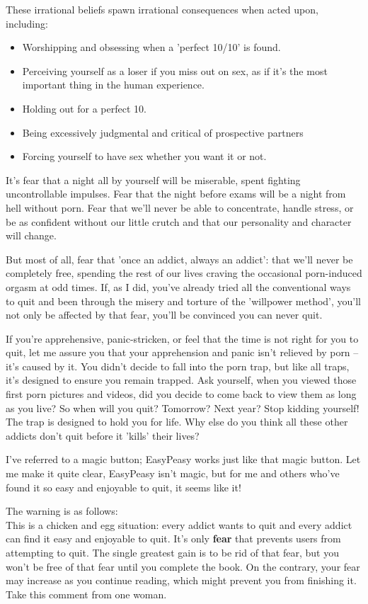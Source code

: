 \documentclass[
]{book}
\begin{document}
These irrational beliefs spawn irrational consequences when acted upon, including:

\begin{itemize}
\item
  Worshipping and obsessing when a 'perfect 10/10' is found.
\item
  Perceiving yourself as a loser if you miss out on sex, as if it's the most important thing in the human experience.
\item
  Holding out for a perfect 10.
\item
  Being excessively judgmental and critical of prospective partners
\item
  Forcing yourself to have sex whether you want it or not.
\end{itemize}

It's fear that a night all by yourself will be miserable, spent fighting uncontrollable impulses. Fear that the night before exams will be a night from hell without porn. Fear that we'll never be able to concentrate, handle stress, or be as confident without our little crutch and that our personality and character will change.

But most of all, fear that 'once an addict, always an addict': that we'll never be completely free, spending the rest of our lives craving the occasional porn-induced orgasm at odd times. If, as I did, you've already tried all the conventional ways to quit and been through the misery and torture of the 'willpower method', you'll not only be affected by that fear, you'll be convinced you can never quit.

If you're apprehensive, panic-stricken, or feel that the time is not right for you to quit, let me assure you that your apprehension and panic isn't relieved by porn -- it's caused by it. You didn't decide to fall into the porn trap, but like all traps, it's designed to ensure you remain trapped. Ask yourself, when you viewed those first porn pictures and videos, did you decide to come back to view them as long as you live? So when will you quit? Tomorrow? Next year? Stop kidding yourself! The trap is designed to hold you for life. Why else do you think all these other addicts don't quit before it 'kills' their lives?

I've referred to a magic button; EasyPeasy works just like that magic button. Let me make it quite clear, EasyPeasy isn't magic, but for me and others who've found it so easy and enjoyable to quit, it seems like it!

The warning is as follows:\\
This is a chicken and egg situation: every addict wants to quit and every addict can find it easy and enjoyable to quit. It's only \textbf{fear} that prevents users from attempting to quit. The single greatest gain is to be rid of that fear, but you won't be free of that fear until you complete the book. On the contrary, your fear may increase as you continue reading, which might prevent you from finishing it. Take this comment from one woman.
\end{document}
